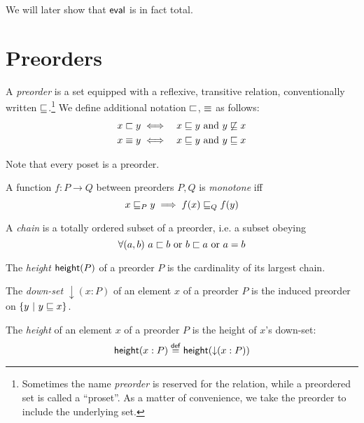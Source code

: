 \documentclass{article}
\renewcommand{\land}{~\text{and}~}
\renewcommand{\lor}{~\text{or}~}
\newcommand{\eqposet}[1]{\ms{Eq}(#1)}
\renewcommand{\eqposet}[1]{\|{#1}\|}
\newcommand{\height}{\ms{height}}
\newcommand{\elemheight}[2]{\height(#2 : #1)}
\newcommand{\down}[2]{\mathop{\downarrow}(#2 : #1)}
\begin{document}
We will later show that $\mathsf{eval}$ is in fact total.



\section{Preorders}

\begin{definition}
  A \emph{preorder} is a set equipped with a reflexive, transitive relation,
  conventionally written $\sqsubseteq$.\footnote{Sometimes the name \emph{preorder} is
    reserved for the relation, while a preordered set is called a ``proset''. As
    a matter of convenience, we take the preorder to include the underlying
    set.} We define additional notation $\sqsubset$, $\equiv$ as follows:
  \begin{eqnarray*}
    x \alt y &\iff& x \ale y \land y \not\ale x\\
    x \aeq y &\iff& x \ale y \land y \ale x
  \end{eqnarray*}

  Note that every poset is a preorder.
\end{definition}

\begin{definition}
  A function $f : P \to Q$ between preorders $P,Q$ is \emph{monotone} iff
  \[ x \sqsubseteq_P y \implies f(x) \sqsubseteq_Q f(y) \]
\end{definition}

\begin{definition}
  A \emph{chain} is a totally ordered subset of a preorder, i.e. a subset
  obeying \[\forall(a, b)\ a \alt b \lor b \alt a \lor a = b \]
\end{definition}

\begin{definition}
  The \emph{height} $\height(P)$ of a preorder $P$ is the cardinality of its largest chain.
\end{definition}


\begin{definition}
  The \emph{down-set} $\down{P}{x}$ of an element $x$ of a preorder $P$ is the
  induced preorder on $\{{y}~|~{y \sqsubseteq x}\}$.
\end{definition}

\begin{definition}
  The \emph{height} of an element $x$ of a preorder $P$ is the height of $x$'s
  down-set: \[\elemheight{P}{x} \defeq \height(\down{P}{x})\]
\end{definition}
\end{document}
